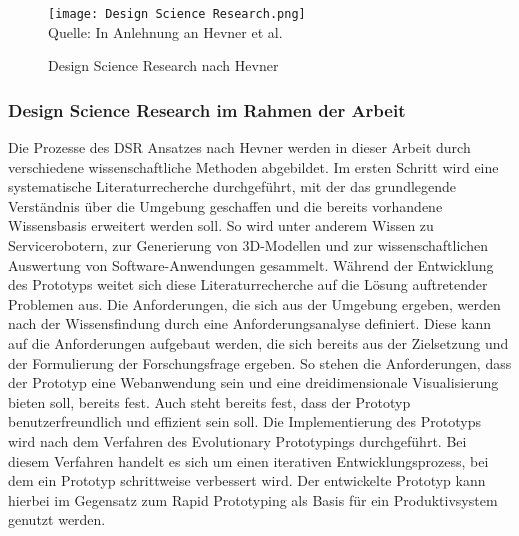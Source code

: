 \begin{figure}[H]
    \caption{Design Science Research nach Hevner}\label{fig:DesignScienceResearch}
    \texttt{[image: Design Science Research.png]}
    \\
    Quelle: In Anlehnung an Hevner et al. \cite[S.~80]{Hevner2004}
\end{figure}

\subsubsection{Design Science Research im Rahmen der Arbeit}

Die Prozesse des \ac{DSR} Ansatzes nach Hevner werden in dieser Arbeit durch verschiedene wissenschaftliche Methoden abgebildet. Im ersten Schritt wird eine systematische Literaturrecherche durchgeführt, mit der das grundlegende Verständnis über die Umgebung geschaffen und die bereits vorhandene Wissensbasis erweitert werden soll. So wird unter anderem Wissen zu Servicerobotern, zur Generierung von 3D-Modellen und zur wissenschaftlichen Auswertung von Software-Anwendungen gesammelt. Während der Entwicklung des Prototyps weitet sich diese Literaturrecherche auf die Lösung auftretender Problemen aus. Die Anforderungen, die sich aus der Umgebung ergeben, werden nach der Wissensfindung durch eine Anforderungsanalyse definiert. Diese kann auf die Anforderungen aufgebaut werden, die sich bereits aus der Zielsetzung und der Formulierung der Forschungsfrage ergeben. So stehen die Anforderungen, dass der Prototyp eine Webanwendung sein und eine dreidimensionale Visualisierung bieten soll, bereits fest. Auch steht bereits fest, dass der Prototyp benutzerfreundlich und effizient sein soll. Die Implementierung des Prototyps wird nach dem Verfahren des Evolutionary Prototypings durchgeführt. Bei diesem Verfahren handelt es sich um einen iterativen Entwicklungsprozess, bei dem ein Prototyp schrittweise verbessert wird. Der entwickelte Prototyp kann hierbei im Gegensatz zum Rapid Prototyping als Basis für ein Produktivsystem genutzt werden.\cite[S.~17-18]{Crinnion1992}
